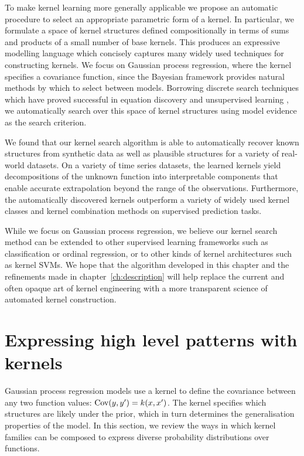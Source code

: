 To make kernel learning more generally applicable we propose an automatic procedure to select an appropriate parametric form of a kernel.
In particular, we formulate a space of kernel structures defined compositionally in terms of sums and products of a small number of base kernels.
This produces an expressive modelling language which concisely captures many widely used techniques for constructing kernels.
We focus on Gaussian process regression, where the kernel specifies a covariance function, since the Bayesian framework provides natural methods by which to select between models.
Borrowing discrete search techniques which have proved successful in equation discovery \citep{Todorovski1997-st} and unsupervised learning \citep{Grosse2012-zi}, we automatically search over this space of kernel structures using model evidence as the search criterion.

We found that our kernel search algorithm is able to automatically recover known structures from synthetic data as well as plausible structures for a variety of real-world datasets. 
On a variety of time series datasets, the learned kernels yield decompositions of the unknown function into interpretable components that enable accurate extrapolation beyond the range of the observations.
Furthermore, the automatically discovered kernels outperform a variety of widely used kernel classes and kernel combination methods on supervised prediction tasks.

While we focus on Gaussian process regression, we believe our kernel search method can be extended to other supervised learning frameworks such as classification or ordinal regression, or to other kinds of kernel architectures such as kernel SVMs.
We hope that the algorithm developed in this chapter and the refinements made in chapter~\ref{ch:description} will help replace the current and often opaque art of kernel engineering with a more transparent science of automated kernel construction.

\section{Expressing high level patterns with kernels} 
\label{sec:construction:structure}

Gaussian process regression models use a kernel to define the covariance between any two function values: ${\textrm{Cov}(y, y') = k(x,x')}$.
The kernel specifies which structures are likely under the \gp{} prior, which in turn determines the generalisation properties of the model.
In this section, we review the ways in which kernel families\footnotemark{} can be composed to express diverse probability distributions over functions. 

